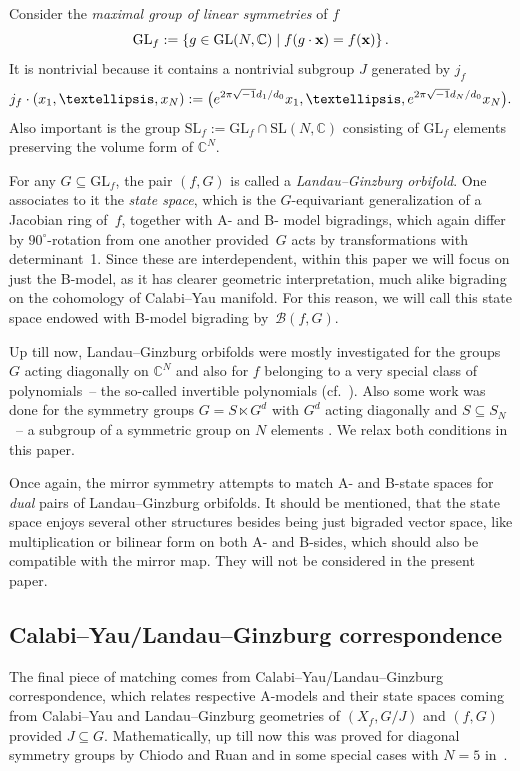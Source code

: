 \documentclass[10pt,a4paper]{article}
\numberwithin{equation}{section}
\newcommand{\CC}{{\mathbb{C}}}
\newcommand{\SL}{{\mathrm{SL}}}
\newcommand{\GL}{{\mathrm{GL}}}
\newcommand{\bx}{{\bf x}}
\def\B{{\mathcal B}}
\begin{document}
Consider the \textit{maximal group of linear symmetries} of $f$
\[
	\GL_f := \left\lbrace g \in \GL(N,\CC) \mid f(g \cdot \bx ) = f(\bx) \right\rbrace.
\]
It is nontrivial because it contains a nontrivial subgroup $J$ generated by $j_f$
\[
	j_f \cdot (x_1,\dots,x_N) := \bigl({\rm e}^{2 \pi \sqrt{-1} d_1/d_0} x_1,\dots, {\rm e}^{2 \pi \sqrt{-1} d_N/d_0}x_N\bigr).
\]
Also important is the group $\SL_f := \GL_f \cap \SL(N,\CC)$ consisting of $\GL_f$ elements preserving the volume form of $\CC^N$.

For any $G \subseteq \GL_f$, the pair $(f,G)$ is called a \textit{Landau--Ginzburg orbifold}. One associates to it the \textit{state space}, which is the $G$-equivariant generalization of a Jacobian ring of~$f$, together with A- and B- model bigradings, which again differ by $90^\circ$-rotation from one another provided~$G$ acts by transformations with determinant~1. Since these are interdependent, within this paper we will focus on just the B-model, as it has clearer geometric interpretation, much alike bigrading on the cohomology of Calabi--Yau manifold. For this reason, we will call this state space endowed with B-model bigrading by~$\B(f,G)$.

Up till now, Landau--Ginzburg orbifolds were mostly investigated for the groups $G$ acting diagonally on $\CC^N$ and also for $f$ belonging to a very special class of polynomials~-- the so-called invertible polynomials (cf.\ \cite{BT2,BTW17,BTW16,FJJS,K03,K06,K09}). Also some work was done for the symmetry groups $G = S \ltimes G^d$ with $G^d$ acting diagonally and $S \subseteq S_N$~-- a subgroup of a symmetric group on $N$ elements \cite{BI21,BI22,CJMPW23,EGZ20,EGZ18,I23,MO70,WWP,Y16}.
We relax both conditions in this paper.

Once again, the mirror symmetry attempts to match A- and B-state spaces for {\itshape dual} pairs of Landau--Ginzburg orbifolds. It should be mentioned, that the state space enjoys several other structures besides being just bigraded vector space, like multiplication or bilinear form on both A- and B-sides, which should also be compatible with the mirror map. They will not be considered in the present paper.

\subsection{Calabi--Yau/Landau--Ginzburg correspondence} The final piece of matching comes from Calabi--Yau/Landau--Ginzburg correspondence, which relates respective A-models and their state spaces coming from Calabi--Yau and Landau--Ginzburg geometries of $(X_f,G/J)$ and $(f,G)$ provided $J\subseteq G$.
Mathematically, up till now this was proved for diagonal symmetry groups by Chiodo and Ruan \cite[Theorem 14]{CR11} and in some special cases with $N=5$ in~\cite{Muk}.
\end{document}
